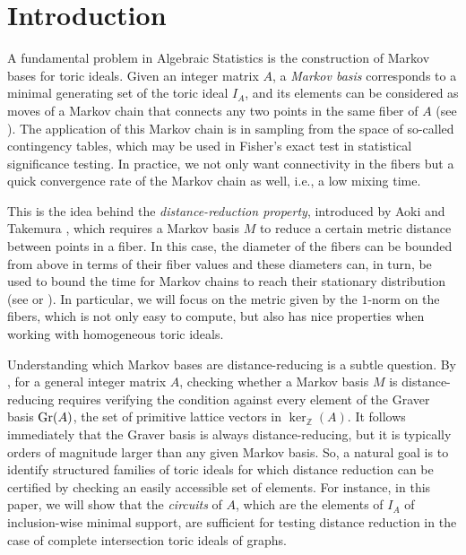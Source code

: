 \documentclass[a4paper, 12pt]{article}
\newcommand{\ZZ}{\mathbb Z}
\theoremstyle{plain}
\theoremstyle{definition}
\theoremstyle{remark}
\begin{document}
\section{Introduction}
\label{sec: intro}
 
A fundamental problem in Algebraic Statistics is the construction of Markov bases for toric ideals. 
Given an integer matrix $A$, a \emph{Markov basis} corresponds to a minimal generating set of the toric ideal $I_A$, and its elements can be considered as moves of a Markov chain that connects any two points in the same fiber of $A$ (see \cite{diaconis1998algebraic}).
The application of this Markov chain is in sampling from the space of so-called contingency tables, which may be used in Fisher's exact test in statistical significance testing.
In practice, we not only want connectivity in the fibers but a quick convergence rate of the Markov chain as well, i.e., a low mixing time. 




This is the idea behind the \emph{distance-reduction property}, introduced by Aoki
and Takemura \cite{aoki2005distance, aoki2012markovbook}, which requires a Markov basis $M$ to reduce a certain metric distance between points in a fiber. In this case, the diameter of the fibers can be bounded from above in terms of their fiber values \cite[Section 3.1]{aoki2005distance} and these diameters can, in turn, be used to bound the time for Markov chains to reach their stationary distribution (see \cite{diaconis1998algebraic} or \cite{DSC_1998}). In particular, we will focus on the metric given by the $1$-norm on the fibers, which is not only easy to compute, but also has nice properties when working with homogeneous toric ideals.


Understanding which Markov bases are distance-reducing is a subtle question. 
By \cite{CK_2024}, for a general integer matrix $A$, 
checking whether a Markov basis $M$ is distance-reducing requires verifying the condition against every element of the Graver basis ${\rm Gr}(A)$, the set of primitive lattice vectors in $\ker_{\ZZ}(A)$.
It follows immediately that the Graver basis is always distance-reducing, but it is typically orders of magnitude larger than any given Markov basis. 
So, a natural goal is to identify structured families of toric ideals for which distance reduction can be certified by checking an easily accessible set of elements.
For instance, in this paper, we will show that the \emph{circuits} of $A$, which are the elements of $I_A$ of inclusion-wise minimal support, are sufficient for testing distance reduction in the case of complete intersection toric ideals of graphs.
\end{document}

